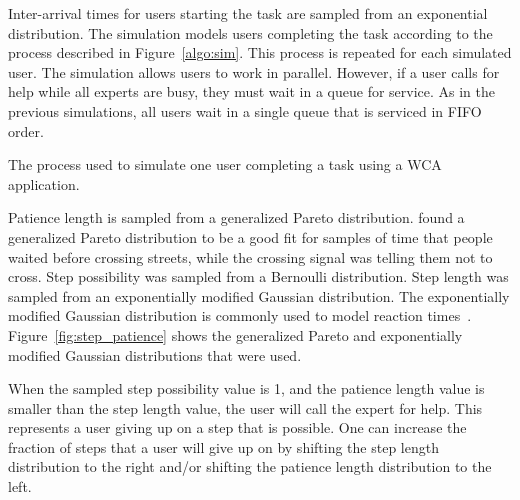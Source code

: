 Inter-arrival times for users starting the task are sampled from an exponential
distribution.
The simulation models users completing the task according to the process
described in Figure~\ref{algo:sim}.
This process is repeated for each simulated user.
The simulation allows users to work in parallel.
However, if a user calls for help while all experts are busy, they must wait in
a queue for service.
As in the previous simulations, all users wait in a single queue that is
serviced in FIFO order.

\begin{algorithm}[h]
  \caption{
    The process used to simulate one user completing a task using a WCA
    application.
  }\label{algo:sim}
\end{algorithm}

Patience length is sampled from a generalized Pareto distribution.
\citet{patience} found a generalized Pareto distribution to be a good fit for
samples of time that people waited before crossing streets, while the crossing
signal was telling them not to cross.
Step possibility was sampled from a Bernoulli distribution.
Step length was sampled from an exponentially modified Gaussian distribution.
The exponentially modified Gaussian distribution is commonly used to model
reaction times~\cite{dawson1988fitting}.
Figure~\ref{fig:step_patience} shows the generalized Pareto and exponentially
modified Gaussian distributions that were used.

When the sampled step possibility value is 1, and the patience length value is
smaller than the step length value, the user will call the expert for help.
This represents a user giving up on a step that is possible.
One can increase the fraction of steps that a user will give up on by shifting
the step length distribution to the right and/or shifting the patience length
distribution to the left.

